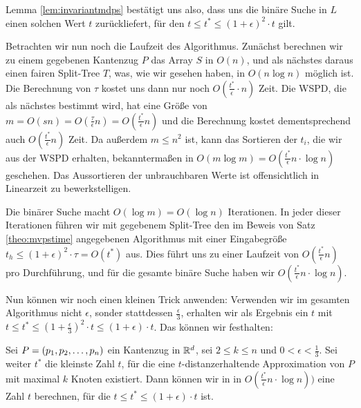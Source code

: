 Lemma \ref{lem:invariantmdps} bestätigt uns also, dass uns die binäre Suche in $L$ einen solchen Wert $t$ zurückliefert, für den $t \leq t^* \leq (1 + \epsilon)^2 \cdot t$ gilt.

Betrachten wir nun noch die Laufzeit des Algorithmus.
Zunächst berechnen wir zu einem gegebenen Kantenzug $P$ das Array $S$ in $O(n)$, und als nächstes daraus einen fairen Split-Tree $T$, was, wie wir gesehen haben, in $O(n \log n)$ möglich ist. 
Die Berechnung von $\tau$ kostet uns dann nur noch $O(\frac{t^*}{\epsilon} \cdot n)$ Zeit. 
Die WSPD, die als nächstes bestimmt wird, hat eine Größe von $m = O(sn) = O(\frac{\tau}{\epsilon}n) = O(\frac{t^*}{\epsilon}n)$ und die Berechnung kostet dementsprechend auch $O(\frac{t^*}{\epsilon}n)$ Zeit. 
Da außerdem $m \leq n^2$ ist, kann das Sortieren der $t_i$, die wir aus der WSPD erhalten, bekanntermaßen in $O(m \log m) = O(\frac{t^*}{\epsilon}n \cdot \log n)$ geschehen. 
Das Aussortieren der unbrauchbaren Werte ist offensichtlich in Linearzeit zu bewerkstelligen. 

Die binärer Suche macht $O(\log m) = O(\log n)$ Iterationen. 
In jeder dieser Iterationen führen wir mit gegebenem Split-Tree den im Beweis von Satz \ref{theo:mvpstime} angegebenen Algorithmus mit einer Eingabegröße $t_h \leq (1 + \epsilon)^2 \cdot \tau = O(t^*)$ aus. 
Dies führt uns zu einer Laufzeit von $O(\frac{t^*}{\epsilon}n)$ pro Durchführung, und für die gesamte binäre Suche haben wir $O(\frac{t^*}{\epsilon}n \cdot \log n)$.

Nun können wir noch einen kleinen Trick anwenden: Verwenden wir im gesamten Algorithmus nicht $\epsilon$, sonder stattdessen $\frac{\epsilon}{3}$, erhalten wir als Ergebnis ein $t$ mit $t \leq t^* \leq (1 + \frac{\epsilon}{3})^2 \cdot t \leq (1 + \epsilon)\cdot t$. Das können wir festhalten:

\begin{theorem}
	Sei $P = (p_1, p_2, \mathellipsis, p_n)$ ein Kantenzug in $\mathbb{R}^d$, sei $2 \leq k \leq n$ und $0 < \epsilon < \frac{1}{3}$. 
	Sei weiter $t^*$ die kleinste Zahl $t$, für die eine $t$-distanzerhaltende Approximation von $P$ mit maximal $k$ Knoten existiert.
	Dann können wir in in $O(\frac{t^*}{\epsilon}n \cdot \log n))$ eine Zahl $t$ berechnen, für die $t \leq t^* \leq (1 + \epsilon)\cdot t$ ist.
\end{theorem}

